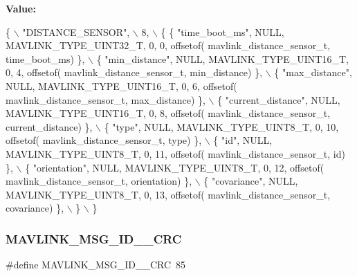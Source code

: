 {\bfseries Value\+:}
\begin{DoxyCode}
\{ \(\backslash\)
    \textcolor{stringliteral}{"DISTANCE\_SENSOR"}, \(\backslash\)
    8, \(\backslash\)
    \{  \{ \textcolor{stringliteral}{"time\_boot\_ms"}, NULL, MAVLINK_TYPE_UINT32_T, 0, 0, offsetof(
      mavlink_distance_sensor_t, time\_boot\_ms) \}, \(\backslash\)
         \{ \textcolor{stringliteral}{"min\_distance"}, NULL, MAVLINK_TYPE_UINT16_T, 0, 4, offsetof(
      mavlink_distance_sensor_t, min\_distance) \}, \(\backslash\)
         \{ \textcolor{stringliteral}{"max\_distance"}, NULL, MAVLINK_TYPE_UINT16_T, 0, 6, offsetof(
      mavlink_distance_sensor_t, max\_distance) \}, \(\backslash\)
         \{ \textcolor{stringliteral}{"current\_distance"}, NULL, MAVLINK_TYPE_UINT16_T, 0, 8, offsetof(
      mavlink_distance_sensor_t, current\_distance) \}, \(\backslash\)
         \{ \textcolor{stringliteral}{"type"}, NULL, MAVLINK_TYPE_UINT8_T, 0, 10, offsetof(
      mavlink_distance_sensor_t, type) \}, \(\backslash\)
         \{ \textcolor{stringliteral}{"id"}, NULL, MAVLINK_TYPE_UINT8_T, 0, 11, offsetof(
      mavlink_distance_sensor_t, \textcolor{keywordtype}{id}) \}, \(\backslash\)
         \{ \textcolor{stringliteral}{"orientation"}, NULL, MAVLINK_TYPE_UINT8_T, 0, 12, offsetof(
      mavlink_distance_sensor_t, orientation) \}, \(\backslash\)
         \{ \textcolor{stringliteral}{"covariance"}, NULL, MAVLINK_TYPE_UINT8_T, 0, 13, offsetof(
      mavlink_distance_sensor_t, covariance) \}, \(\backslash\)
         \} \(\backslash\)
\}
\end{DoxyCode}
\mbox{\label{mavlink__msg__distance__sensor_8h_a720eb01d62734183f2f0fc290b211fe3}} 
\subsubsection{M\+A\+V\+L\+I\+N\+K\+\_\+\+M\+S\+G\+\_\+\+I\+D\+\_\+\_\+\+C\+RC}
{\footnotesize\ttfamily \#define M\+A\+V\+L\+I\+N\+K\+\_\+\+M\+S\+G\+\_\+\+I\+D\+\_\+\_\+\+C\+RC~85}

\mbox{\label{mavlink__msg__distance__sensor_8h_a56c876dae978add8044c3f3a76f9203a}} 
